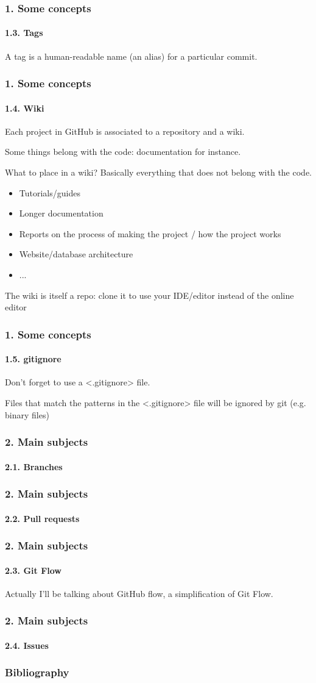 \documentclass{beamer}
\def\texttt#1{<#1>}
\begin{document}
\begin{frame}
\frametitle{1. Some concepts}
\framesubtitle{1.3. Tags}

A tag is a human-readable name (an alias) for a particular commit.

\end{frame}

\begin{frame}
\frametitle{1. Some concepts}
\framesubtitle{1.4. Wiki}

Each project in GitHub is associated to a repository and a wiki.

Some things belong with the code: documentation for instance.

What to place in a wiki? Basically everything that does not belong with the code.
\begin{itemize}
  \item Tutorials/guides
  \item Longer documentation
  \item Reports on the process of making the project / how the project works
  \item Website/database architecture
  \item ...
\end{itemize}

The wiki is itself a repo: clone it to use your IDE/editor instead of the online editor

\end{frame}

\begin{frame}
\frametitle{1. Some concepts}
\framesubtitle{1.5. gitignore}

Don't forget to use a \texttt{.gitignore} file.

Files that match the patterns in the \texttt{.gitignore} file will be ignored by git (e.g. binary files)

\end{frame}

\begin{frame}
\frametitle{2. Main subjects}
\framesubtitle{2.1. Branches}

\end{frame}

\begin{frame}
\frametitle{2. Main subjects}
\framesubtitle{2.2. Pull requests}

\end{frame}

\begin{frame}
\frametitle{2. Main subjects}
\framesubtitle{2.3. Git Flow}

Actually I'll be talking about GitHub flow, a simplification of Git Flow.

\end{frame}  

\begin{frame}
\frametitle{2. Main subjects}
\framesubtitle{2.4. Issues}

\end{frame}  

\begin{frame}%
  \scriptsize
  \frametitle{Bibliography}
  
  
\end{frame}
\end{document}
